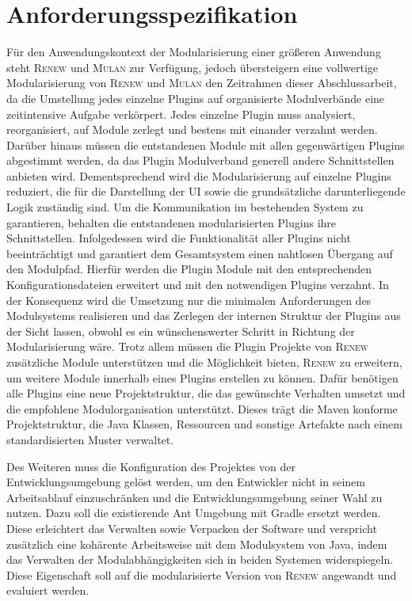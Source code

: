 \section{Anforderungsspezifikation} 
	Für den Anwendungskontext der Modularisierung einer größeren Anwendung steht \textsc{Renew} und \textsc{Mulan} zur Verfügung, jedoch übersteigern eine vollwertige Modularisierung von \textsc{Renew} und \textsc{Mulan} den Zeitrahmen dieser Abschlussarbeit, da die Umstellung jedes einzelne Plugins auf organisierte Modulverbände eine zeitintensive Aufgabe verkörpert. Jedes einzelne Plugin muss analysiert, reorganisiert, auf Module zerlegt und bestens mit einander verzahnt werden. Darüber hinaus müssen die entstandenen Module mit allen gegenwärtigen Plugins abgestimmt werden, da das Plugin Modulverband generell andere Schnittstellen anbieten wird. \bigbreak
	Dementsprechend wird die Modularisierung auf einzelne Plugins reduziert, die für die Darstellung der UI sowie die grundsätzliche darunterliegende Logik zuständig sind. Um die Kommunikation im bestehenden System zu garantieren, behalten die entstandenen modularisierten Plugins ihre Schnittstellen. Infolgedessen wird die Funktionalität aller Plugins nicht beeinträchtigt und garantiert dem Gesamtsystem einen nahtlosen Übergang auf den Modulpfad. Hierfür werden die Plugin Module mit den entsprechenden Konfigurationsdateien erweitert und mit den notwendigen Plugins verzahnt. In der Konsequenz wird die Umsetzung nur die minimalen Anforderungen des Modulsystems realisieren und das Zerlegen der internen Struktur der Plugins aus der Sicht lassen, obwohl es ein wünschenswerter Schritt in Richtung der Modularisierung wäre. \newline 
	Trotz allem müssen die Plugin Projekte von \textsc{Renew} zusätzliche Module unterstützen und die Möglichkeit bieten, \textsc{Renew} zu erweitern, um weitere Module innerhalb eines Plugins erstellen zu können. Dafür benötigen alle Plugins eine neue Projektstruktur, die das gewünschte Verhalten umsetzt und die empfohlene Modulorganisation unterstützt. Dieses trägt die Maven konforme Projektstruktur, die Java Klassen, Ressourcen und sonstige Artefakte nach einem standardisierten Muster verwaltet.  \bigbreak

	Des Weiteren muss die Konfiguration des Projektes von der Entwicklungsumgebung gelöst werden, um den Entwickler nicht in seinem Arbeitsablauf einzuschränken und die Entwicklungsumgebung seiner Wahl zu nutzen. Dazu soll die existierende Ant Umgebung mit Gradle ersetzt werden. Diese erleichtert das Verwalten sowie Verpacken der Software und verspricht zusätzlich eine kohärente Arbeitsweise mit dem Modulsystem von Java, indem das Verwalten der Modulabhängigkeiten sich in beiden Systemen widerspiegeln. Diese Eigenschaft soll auf die modularisierte Version von \textsc{Renew} angewandt und evaluiert werden. \bigbreak

